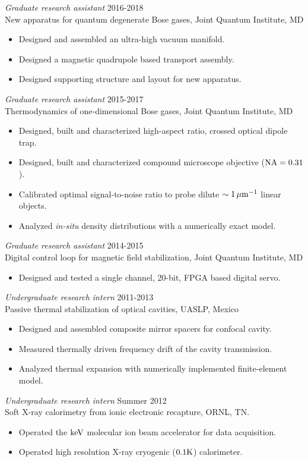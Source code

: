 \documentclass[margin, 10pt]{res} %
\begin{document}
\begin{resume}
{\sl Graduate research assistant} \hfill 2016-2018 \\
New apparatus for quantum degenerate Bose gases, Joint Quantum Institute, MD
\begin{itemize} \itemsep -2pt
\item Designed and assembled an ultra-high vacuum manifold.
\item Designed a magnetic quadrupole based transport assembly.
\item Designed supporting structure and layout for new apparatus.
\end{itemize} 

{\sl Graduate research assistant} \hfill 2015-2017 \\
Thermodynamics of one-dimensional Bose gases, Joint Quantum Institute, MD
\begin{itemize} \itemsep -2pt
\item Designed, built and characterized high-aspect ratio, crossed optical dipole trap.
\item Designed, built and characterized compound microscope objective (${{\rm NA} = 0.31}$).
\item Calibrated optimal signal-to-noise ratio to probe dilute ${\sim 1 \,{\rm \mu m ^{-1}}}$ linear objects.
\item Analyzed {\it in-situ} density distributions with a numerically exact model.
\end{itemize} 

{\sl Graduate research assistant} \hfill 2014-2015 \\
Digital control loop for magnetic field stabilization, Joint Quantum Institute, MD
\begin{itemize} \itemsep -2pt
\item Designed and tested a single channel, 20-bit, FPGA based digital servo.
\end{itemize} 

{\sl Undergraduate research intern} \hfill 2011-2013 \\
Passive thermal stabilization of optical cavities, UASLP, Mexico 
\begin{itemize} \itemsep -2pt
\item Designed and assembled composite mirror spacers for confocal cavity.
\item Measured thermally driven frequency drift of the cavity transmission. 
\item Analyzed thermal expansion with numerically implemented finite-element model.
\end{itemize}
 
{\sl Undergraduate research intern} \hfill Summer 2012 \\
Soft X-ray calorimetry from ionic electronic recapture, ORNL, TN.
\begin{itemize} \itemsep -2pt
\item Operated the ${{\rm keV}}$ molecular ion beam accelerator for data acquisition.
\item Operated high resolution X-ray cryogenic (${0.1 {\rm K}}$) calorimeter.
\end{itemize} 

\end{resume}
\end{document}
